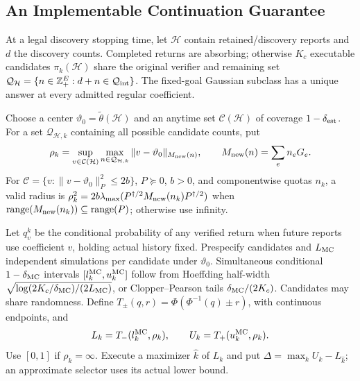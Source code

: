 \subsection{An Implementable Continuation Guarantee}
\label{app:continuation-construction}
\label{app:v23selector}

At a legal discovery stopping time, let $\mathcal H$ contain retained/discovery reports and $d$ the discovery counts. Completed returns are absorbing; otherwise $K_c$ executable candidates $\pi_k(\mathcal H)$ share the original verifier and remaining set $\mathcal Q_{\mathcal H}=\{n\in\mathbb Z_+^E:d+n\in\mathcal Q_{\rm int}\}$. The fixed-goal Gaussian subclass has a unique answer at every admitted regular coefficient.

Choose a center $\vartheta_0=\widetilde\theta(\mathcal H)$ and an anytime set $\mathcal C(\mathcal H)$ of coverage $1-\delta_{\rm est}$. For a set $\mathcal Q_{\mathcal H,k}$ containing all possible candidate counts, put
$$\rho_k=\sup_{v\in\mathcal C(\mathcal H)}
\max_{n\in\mathcal Q_{\mathcal H,k}}
\|v-\vartheta_0\|_{M_{\rm new}(n)},\qquad
M_{\rm new}(n)=\sum_e n_eG_e.$$
For $\mathcal C=\{v:\|v-\vartheta_0\|_P^2\leq2b\}$, $P\succeq0$, $b>0$, and componentwise quotas $n_k$, a valid radius is $\rho_k^2=2b\lambda_{\max}(P^{\dagger/2}M_{\rm new}(n_k)P^{\dagger/2})$ when $\operatorname{range}(M_{\rm new}(n_k))\subseteq\operatorname{range}(P)$; otherwise use infinity.

Let $q_v^k$ be the conditional probability of any verified return when future reports use coefficient $v$, holding actual history fixed. Prespecify candidates and $L_{\rm MC}$ independent simulations per candidate under $\vartheta_0$. Simultaneous conditional $1-\delta_{\rm MC}$ intervals $[l_k^{\rm MC},u_k^{\rm MC}]$ follow from Hoeffding half-width $\sqrt{\log(2K_c/\delta_{\rm MC})/(2L_{\rm MC})}$, or Clopper--Pearson tails $\delta_{\rm MC}/(2K_c)$. Candidates may share randomness. Define $T_\pm(q,r)=\Phi(\Phi^{-1}(q)\pm r)$, with continuous endpoints, and
\begin{equation}
L_k=T_-(l_k^{\rm MC},\rho_k),\qquad
U_k=T_+(u_k^{\rm MC},\rho_k).
\label{eq:v23transport}
\end{equation}
Use $[0,1]$ if $\rho_k=\infty$. Execute a maximizer $\widehat k$ of $L_k$ and put $\Delta=\max_kU_k-L_{\widehat k}$; an approximate selector uses its actual lower bound.

